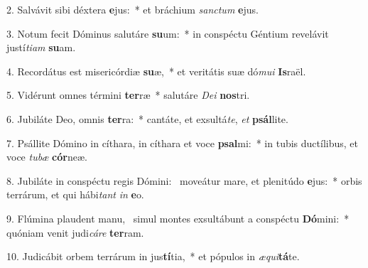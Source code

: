 2. Salvávit sibi déxtera \textbf{e}jus:~*  et bráchium \textit{sanc}\textit{tum} \textbf{e}jus.\

3. Notum fecit Dóminus salutáre \textbf{su}um:~*  in conspéctu Géntium revelávit justí\textit{ti}\textit{am} \textbf{su}am.\

4. Recordátus est misericórdiæ \textbf{su}æ,~*  et veritátis suæ dó\textit{mu}\textit{i} \textbf{Is}raël.\

5. Vidérunt omnes términi \textbf{ter}ræ~*  salutáre \textit{De}\textit{i} \textbf{nos}tri.\

6. Jubiláte Deo, omnis \textbf{ter}ra:~*  cantáte, et exsultá\textit{te}, \textit{et} \textbf{psál}lite.\

7. Psállite Dómino in cíthara, in cíthara et voce \textbf{psal}mi:~*  in tubis ductílibus, et voce \textit{tu}\textit{bæ} \textbf{cór}neæ.\

8. Jubiláte in conspéctu regis Dómini: \dag\  moveátur mare, et plenitúdo \textbf{e}jus:~*  orbis terrárum, et qui hábi\textit{tant} \textit{in} \textbf{e}o.\

9. Flúmina plaudent manu, \dag\  simul montes exsultábunt a conspéctu \textbf{Dó}mini:~*  quóniam venit judi\textit{cá}\textit{re} \textbf{ter}ram.\

10. Judicábit orbem terrárum in jus\textbf{tí}tia,~*  et pópulos in \textit{æ}\textit{qui}\textbf{tá}te.\

